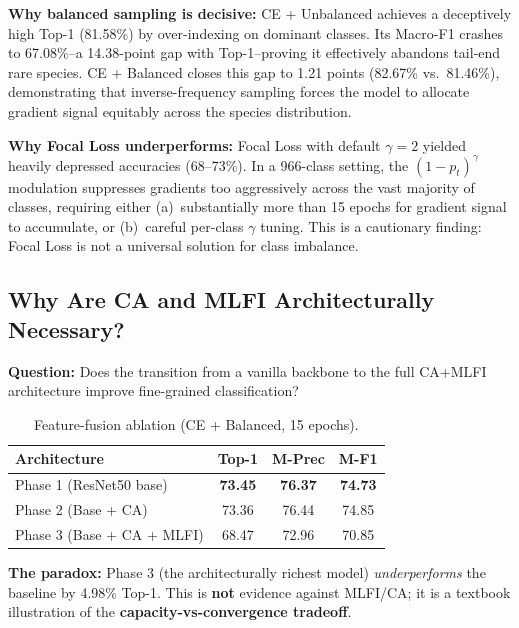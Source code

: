 \documentclass[10pt, twocolumn]{article}
\begin{document}
\textbf{Why balanced sampling is decisive:}
CE + Unbalanced achieves a deceptively high Top-1 (81.58\%) by over-indexing on dominant classes. Its Macro-F1 crashes to 67.08\%--a 14.38-point gap with Top-1--proving it effectively abandons tail-end rare species. CE + Balanced closes this gap to 1.21 points (82.67\% vs.\ 81.46\%), demonstrating that inverse-frequency sampling forces the model to allocate gradient signal equitably across the species distribution.

\textbf{Why Focal Loss underperforms:}
Focal Loss with default $\gamma=2$ yielded heavily depressed accuracies (68--73\%). In a 966-class setting, the $(1-p_t)^\gamma$ modulation suppresses gradients too aggressively across the vast majority of classes, requiring either (a)~substantially more than 15 epochs for gradient signal to accumulate, or (b)~careful per-class $\gamma$ tuning. This is a cautionary finding: Focal Loss is not a universal solution for class imbalance.

\subsection{Why Are CA and MLFI Architecturally Necessary?}

\textbf{Question:} Does the transition from a vanilla backbone to the full CA+MLFI architecture improve fine-grained classification?

\begin{table}[H]
\centering
\caption{Feature-fusion ablation (CE + Balanced, 15 epochs).}
\label{tab:unit2}
\small
\begin{tabular}{@{}lccc@{}}
\toprule
\textbf{Architecture} & \textbf{Top-1} & \textbf{M-Prec} & \textbf{M-F1} \\
\midrule
Phase 1 (ResNet50 base) & \textbf{73.45} & \textbf{76.37} & \textbf{74.73} \\
Phase 2 (Base + CA)     & 73.36 & 76.44 & 74.85 \\
Phase 3 (Base + CA + MLFI) & 68.47 & 72.96 & 70.85 \\
\bottomrule
\end{tabular}
\end{table}

\textbf{The paradox:} Phase 3 (the architecturally richest model) \emph{underperforms} the baseline by 4.98\% Top-1. This is \textbf{not} evidence against MLFI/CA; it is a textbook illustration of the \textbf{capacity-vs-convergence tradeoff}.
\end{document}
